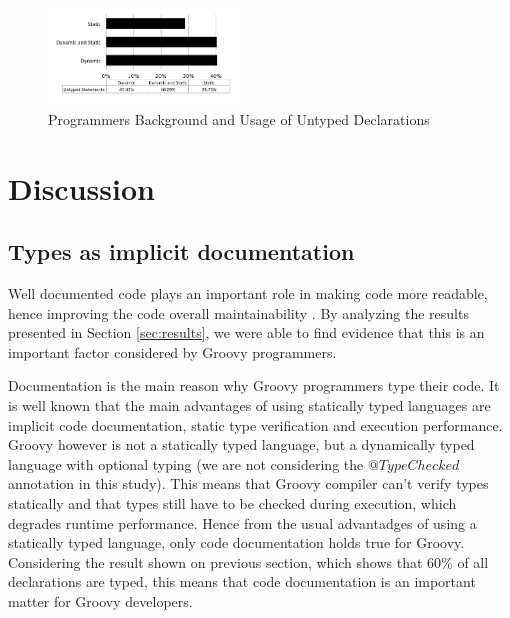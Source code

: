 \documentclass[preprint]{sigplanconf}
\begin{document}
\begin{figure}[ht]
\centering \includegraphics[width=0.45\textwidth]{images/untyped_background} 
\caption{Programmers Background and Usage of Untyped Declarations}
\label{fig:untyped_background} 
\end{figure}


















%
%
\section{Discussion\label{sec:Discussion}}


\subsection{Types as implicit documentation}
Well documented code plays an important role in making code more readable, hence improving the code overall maintainability \cite{Iso2004}.
By analyzing the results presented in Section \ref{sec:results}, we were able to find evidence that this is an important factor considered by Groovy programmers.

Documentation is the main reason why Groovy programmers type their code.
It is well known that the main advantages of using statically typed languages are implicit code documentation, static type verification and execution performance.
Groovy however is not a statically typed language, but a dynamically typed language with optional typing (we are not considering the $@TypeChecked$ annotation in this study).
This means that Groovy compiler can't verify types statically and that types still have to be checked during execution, which degrades runtime performance.
Hence from the usual advantadges of using a statically typed language, only code documentation holds true for Groovy.
Considering the result shown on previous section, which shows that 60\% of all declarations are typed, this means that code documentation is an important matter for Groovy developers.
\end{document}
